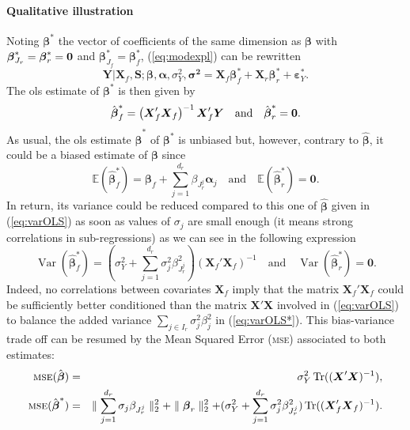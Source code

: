 \documentclass[11pt,a4paper]{article}
\begin{document}
\paragraph{Qualitative illustration} Noting $\boldsymbol{\beta}^*$ the vector of coefficients of the same dimension as $\boldsymbol{\beta}$ with $\boldsymbol{\beta}_{J_r}^*=\boldsymbol{\beta}_{r}^*={\bf 0}$ and $\boldsymbol{\beta}_{J_f}^*=\boldsymbol{\beta}_{f}^*$, (\ref{eq:modexpl}) can be rewritten
\begin{equation}
	\boldsymbol{Y}{|\boldsymbol{X}_f,\boldsymbol{S}};\boldsymbol{\beta},\boldsymbol{\alpha},\sigma_Y^2,\boldsymbol{\sigma^2}=\boldsymbol{X}_f\boldsymbol{\beta}_f^*+\boldsymbol{X}_r\boldsymbol{\beta}_r^*+\boldsymbol{\varepsilon}_Y^*.\label{eq:modexpl2}
\end{equation}
The {\sc ols} estimate of $\boldsymbol{\beta}^*$ is then given by
	\begin{equation}
		\hat{\boldsymbol{\beta}}^*_f=\left(\boldsymbol{X}_f'\boldsymbol{X}_f \right) ^{-1}\boldsymbol{X}_f'\boldsymbol{Y} \quad \mbox{and} \quad \hat{\boldsymbol{\beta}}^*_r = {\bf 0}.
	\end{equation}
As usual, the {\sc ols} estimate $\hat{\boldsymbol{\beta}}^*$ of $\boldsymbol{\beta}^*$ is unbiased but, however, contrary to $\hat{\boldsymbol{\beta}}$, it could be a biased estimate of $\boldsymbol{\beta}$ since
		\begin{equation}
			\mathbb{E}(\hat{\boldsymbol{\beta}}_f^*)=\boldsymbol{\beta}_f+\sum_{j =1}^{d_r}\beta_{J_r^j}\boldsymbol{\alpha}_j \quad \textrm{and}\quad \mathbb{E}(\hat{\boldsymbol{\beta}}_r^*)=\boldsymbol{0}.
		\end{equation}
In return, its variance could be reduced compared to this one of $\hat{\boldsymbol{\beta}}$ given in (\ref{eq:varOLS}) as soon as values of $\sigma_j$ are small enough (it means strong correlations in sub-regressions) as we can see in the following expression
		\begin{equation}
			\operatorname{Var}(\hat{\boldsymbol{\beta}}_f^*)= (\sigma^2_Y+\sum_{j =1}^{d_r}\sigma^2_{j}\beta_{J_r^j}^2)(\boldsymbol{X}_f' \boldsymbol{X}_f)^{-1} \quad \textrm{and} \quad\operatorname{Var}(\hat{\boldsymbol{\beta}}_r^*)= \boldsymbol{0}. \label{eq:varOLS*}
		\end{equation}
Indeed, no correlations between covariates $\boldsymbol{X}_f$ imply that the matrix $\boldsymbol{X}_f' \boldsymbol{X}_f$ could be sufficiently better conditioned than the matrix $\boldsymbol{X}' \boldsymbol{X}$ involved in (\ref{eq:varOLS}) to balance the added variance $\sum_{j \in I_r}\sigma^2_{j}\beta_{j}^2$ in (\ref{eq:varOLS*}). This bias-variance trade off can be resumed by the Mean Squared Error (\textsc{mse}) associated to both estimates:
	\begin{eqnarray}
			\textsc{mse}(\hat{\boldsymbol{\beta}})&=& \sigma_Y^2 \operatorname{Tr}((\boldsymbol{X}'\boldsymbol{X})^{-1}),
			 \\
			\textsc{mse}(\hat{\boldsymbol{\beta}}^*)&=& \parallel\sum_{j =1}^{d_r}\sigma_{j}\beta_{J_r^j} \parallel_2^2 +\parallel \boldsymbol{\beta}_r\parallel^2_2 + (\sigma^2_Y+\sum_{j =1}^{d_r}\sigma^2_{j}\beta_{J_r^j}^2 ) \operatorname{Tr}((\boldsymbol{X}_f' \boldsymbol{X}_f)^{-1}).
	\end{eqnarray}	 
\end{document}

